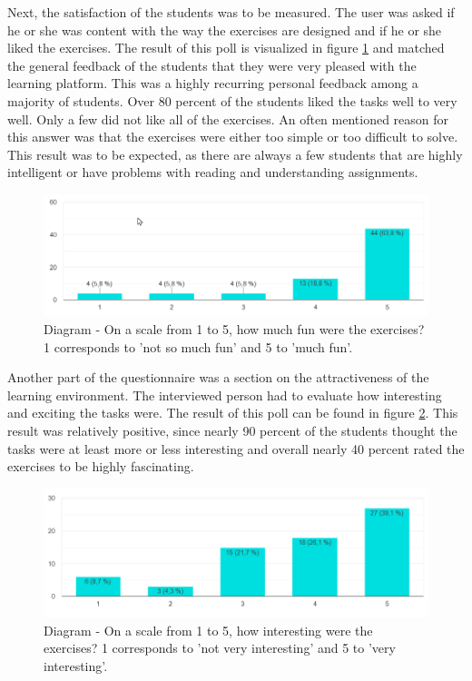 Next, the satisfaction of the students was to be measured. The user was asked if he or she was content with the way the exercises are designed and if he or she liked the exercises. The result of this poll is visualized in figure \ref{fig:f3} and matched the general feedback of the students that they were very pleased with the learning platform. This was a highly recurring personal feedback among a majority of students. Over 80 percent of the students liked the tasks well to very well. Only a few did not like all of the exercises. An often mentioned reason for this answer was that the exercises were either too simple or too difficult to solve. This result was to be expected, as there are always a few students that are highly intelligent or have problems with reading and understanding assignments.

\begin{figure}[H]
    \centering
    \includegraphics[width=1 \columnwidth]{figures/f3.png}
    \caption{Diagram - On a scale from 1 to 5, how much fun were the exercises? 1 corresponds to 'not so much fun' and 5 to 'much fun'.} 
    \label{fig:f3} 
\end{figure}

Another part of the questionnaire was a section on the attractiveness of the learning environment. The interviewed person had to evaluate how interesting and exciting the tasks were. The result of this poll can be found in figure \ref{fig:f4}. This result was relatively positive, since nearly 90 percent of the students thought the tasks were at least more or less interesting and overall nearly 40 percent rated the exercises to be highly fascinating.

\begin{figure}[H]
    \centering
    \includegraphics[width=1 \columnwidth]{figures/f4.png}
    \caption{Diagram - On a scale from 1 to 5, how interesting were the exercises? 1 corresponds to 'not very interesting' and 5 to 'very interesting'.}
    \label{fig:f4} 
\end{figure}

